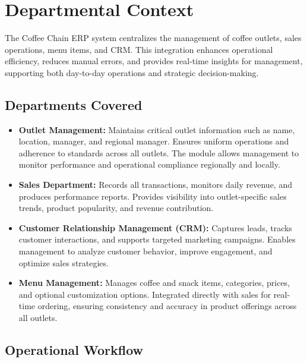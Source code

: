 \chapter{Departmental Context}

The Coffee Chain ERP system centralizes the management of coffee outlets, sales operations, menu items, and CRM. This integration enhances operational efficiency, reduces manual errors, and provides real-time insights for management, supporting both day-to-day operations and strategic decision-making.

\section*{Departments Covered}

\begin{itemize}
    \item \textbf{Outlet Management:}  
    Maintains critical outlet information such as name, location, manager, and regional manager. Ensures uniform operations and adherence to standards across all outlets. The module allows management to monitor performance and operational compliance regionally and locally.
    
    \item \textbf{Sales Department:}  
    Records all transactions, monitors daily revenue, and produces performance reports. Provides visibility into outlet-specific sales trends, product popularity, and revenue contribution.
    
    \item \textbf{Customer Relationship Management (CRM):}  
    Captures leads, tracks customer interactions, and supports targeted marketing campaigns. Enables management to analyze customer behavior, improve engagement, and optimize sales strategies.
    
    \item \textbf{Menu Management:}  
    Manages coffee and snack items, categories, prices, and optional customization options. Integrated directly with sales for real-time ordering, ensuring consistency and accuracy in product offerings across all outlets.
\end{itemize}

\section*{Operational Workflow}

